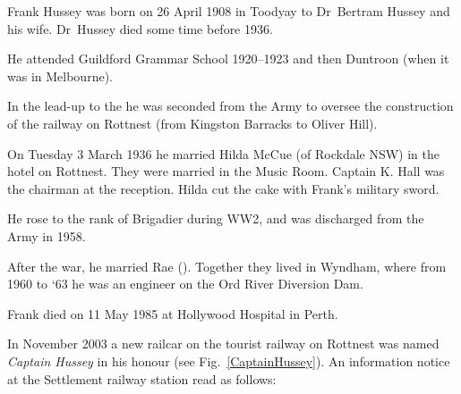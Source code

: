 
Frank Hussey was born on 26 April 1908 in Toodyay\cite{RaeWestAus} to Dr~Bertram Hussey and his wife.\cite{WesternMail1936}
Dr~Hussey died some time before 1936.\cite{MilitaryWedding}

He attended Guildford Grammar School 1920--1923\cite{FBHguildford}
and then Duntroon (when it was in Melbourne).\cite{RaeWestAus}

In the lead-up to the  he was seconded from the Army to oversee the construction of the railway on Rottnest
(from Kingston Barracks to Oliver Hill).\cite{RaeWestAus}

On Tuesday 3 March 1936 he married Hilda McCue (of Rockdale NSW\cite{WestAus1936p4})
in the hotel on Rottnest.\cite{WestAus1936p19}
They were married in the Music Room.\cite{MilitaryWedding}
Captain K. Hall was the chairman at the reception.\cite{MilitaryWedding}
Hilda cut the cake with Frank's military sword.\cite{MilitaryWedding}

He rose to the rank of Brigadier during WW2,\cite{FBHwar}
and was discharged from the Army in 1958.\cite{CaptainHusseyDisplay}

After the war, he married Rae (). Together they lived in Wyndham,
where from 1960 to `63 he was an engineer on the Ord River Diversion Dam.

Frank died on 11 May 1985 at Hollywood Hospital in Perth.

In November 2003 a new railcar on the tourist railway on Rottnest was named \emph{Captain Hussey} in his honour (see Fig.~\ref{CaptainHussey}).\cite{RIA2004}
An information notice at the Settlement railway station read as follows:\cite{CaptainHusseyDisplay}

